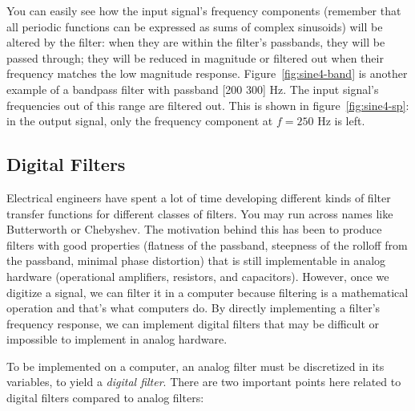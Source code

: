 You can easily see how the input signal's frequency components
(remember that all periodic functions can be expressed as sums of
complex sinusoids) will be altered by the filter: when they are within
the filter's passbands, they will be passed through; they will be
reduced in magnitude or filtered out when their frequency matches the
low magnitude response. Figure~\ref{fig:sine4-band} is another example
of a bandpass filter with passband [200 300] Hz. The input signal's
frequencies out of this range are filtered out. This is shown in
figure~\ref{fig:sine4-sp}: in the output signal, only the frequency
component at $f=250$ Hz is left.


\subsection{Digital Filters}

Electrical engineers have spent a lot of time developing different
kinds of filter transfer functions for different classes of filters.
You may run across names like Butterworth or Chebyshev. The motivation
behind this has been to produce filters with good properties (flatness
of the passband, steepness of the rolloff from the passband, minimal
phase distortion) that is still implementable in analog hardware
(operational amplifiers, resistors, and capacitors). However, once we
digitize a signal, we can filter it in a computer because filtering is
a mathematical operation and that's what computers do. By directly
implementing a filter's frequency response, we can implement digital
filters that may be difficult or impossible to implement in analog
hardware.

To be implemented on a computer, an analog filter must be discretized
in its variables, to yield a \emph{digital filter}. There are two
important points here related to digital filters compared to analog
filters:

